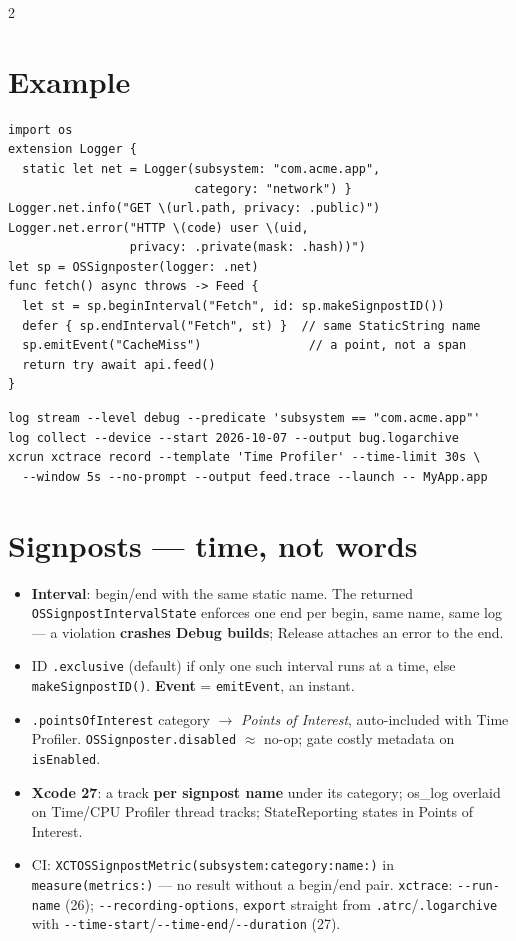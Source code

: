 \documentclass[8pt]{extarticle}
\newcommand\ct[1]{\texttt{#1}}
\newcommand\dd{\hbox{-}\hbox{-}}
\begin{document}
\begin{multicols}{2}
\section{Example}
\begin{lstlisting}[language=SwiftSheet]
import os
extension Logger {
  static let net = Logger(subsystem: "com.acme.app",
                          category: "network") }
Logger.net.info("GET \(url.path, privacy: .public)")
Logger.net.error("HTTP \(code) user \(uid,
                 privacy: .private(mask: .hash))")
let sp = OSSignposter(logger: .net)
func fetch() async throws -> Feed {
  let st = sp.beginInterval("Fetch", id: sp.makeSignpostID())
  defer { sp.endInterval("Fetch", st) }  // same StaticString name
  sp.emitEvent("CacheMiss")               // a point, not a span
  return try await api.feed()
}
\end{lstlisting}
\begin{lstlisting}[language=ShSheet]
log stream --level debug --predicate 'subsystem == "com.acme.app"'
log collect --device --start 2026-10-07 --output bug.logarchive
xcrun xctrace record --template 'Time Profiler' --time-limit 30s \
  --window 5s --no-prompt --output feed.trace --launch -- MyApp.app
\end{lstlisting}

\section{Signposts — time, not words}
\begin{itemize}
  \item \textbf{Interval}: begin/end with the same static name. The returned
        \ct{OSSignpostIntervalState} enforces one end per begin, same name, same log — a
        violation \textbf{crashes Debug builds}; Release attaches an error to the end.
  \item ID \ct{.exclusive} (default) if only one such interval runs at a time, else
        \ct{makeSignpostID()}. \textbf{Event} = \ct{emitEvent}, an instant.
  \item \ct{.pointsOfInterest} category $\to$ \emph{Points of Interest}, auto-included with
        Time Profiler. \ct{OSSignposter.disabled} $\approx$ no-op; gate costly metadata on
        \ct{isEnabled}.
  \item \textbf{Xcode 27}: a track \textbf{per signpost name} under its category; os\_log
        overlaid on Time/CPU Profiler thread tracks; StateReporting states in Points of Interest.
  \item CI: \ct{XCTOSSignpostMetric(subsystem:category:name:)} in \ct{measure(metrics:)} —
        no result without a begin/end pair. \ct{xctrace}: \ct{\dd{}run-name} (26);
        \ct{\dd{}recording-options}, \ct{export} straight from \ct{.atrc}/\ct{.logarchive}
        with \ct{\dd{}time-start}/\ct{\dd{}time-end}/\ct{\dd{}duration} (27).
\end{itemize}


\end{multicols}
\end{document}

